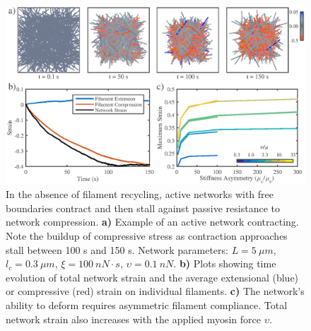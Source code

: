 \documentclass[10pt,letterpaper]{article}
\begin{document}
\begin{figure}[h!]
\centering
\includegraphics[width=\hsize]{figures/figure4a}
\caption{\label{fig:active_con} In the absence of filament recycling, active networks with free boundaries contract and then stall against passive resistance to network compression. \textbf{a)}  Example of an active network contracting. Note the buildup of compressive stress as contraction approaches stall between 100 s and 150 s.  Network parameters: $L=5\: \mu m$, $l_c=0.3\: \mu m$, $\xi=100\: nN\cdot s$, $\upsilon=0.1\: nN$.  \textbf{b)} Plots showing time evolution of total network strain and  the average extensional (blue) or compressive (red) strain on individual filaments.   \textbf{c)} The network's ability to deform requires asymmetric filament compliance.  Total network strain also increases with the applied myosin force $\upsilon$.}
\end{figure}
\end{document}
